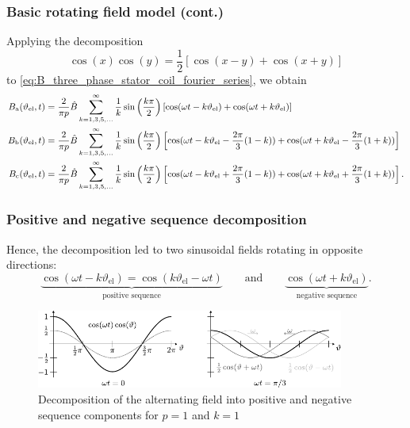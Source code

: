 \begin{frame}
	\frametitle{Basic rotating field model (cont.)}
    Applying the decomposition $$\cos(x)\cos(y) = \frac{1}{2} \left[ \cos(x-y) + \cos(x+y) \right]$$ to \eqref{eq:B_three_phase_stator_coil_fourier_series}, we obtain
    \begin{equation*}
        \small
        \begin{split}
            B_\mathrm{a}(\vartheta_\mathrm{el}, t) &= \frac{2}{\pi p} \hat{B} \sum_{k=1,3,5,\ldots}^{\infty}   \frac{1}{k}\sin\left(\frac{k \pi}{2}\right)\left[\cos(\omega t - k \vartheta_\mathrm{el}) + \cos(\omega t + k \vartheta_\mathrm{el})\right]\\
            B_\mathrm{b}(\vartheta_\mathrm{el}, t) &= \frac{2}{\pi p} \hat{B} \sum_{k=1,3,5,\ldots}^{\infty}   \frac{1}{k}\sin\left(\frac{k \pi}{2}\right)\left[\cos(\omega t - k \vartheta_\mathrm{el} - \frac{2\pi}{3}(1-k)) + \cos(\omega t + k \vartheta_\mathrm{el} - \frac{2\pi}{3}(1+k))\right]\\
            B_\mathrm{c}(\vartheta_\mathrm{el}, t) &= \frac{2}{\pi p} \hat{B} \sum_{k=1,3,5,\ldots}^{\infty}   \frac{1}{k}\sin\left(\frac{k \pi}{2}\right)\left[\cos(\omega t - k \vartheta_\mathrm{el} + \frac{2\pi}{3}(1-k)) + \cos(\omega t + k \vartheta_\mathrm{el} + \frac{2\pi}{3}(1+k))\right].
        \end{split}
    \end{equation*}

\end{frame}

\begin{frame}
	\frametitle{Positive and negative sequence decomposition}
    Hence, the decomposition led to two sinusoidal fields rotating in opposite directions:
    $$\underbrace{\cos(\omega t - k \vartheta_\mathrm{el})=\cos(k \vartheta_\mathrm{el} - \omega t)}_{\mbox{positive sequence}} \qquad  \mbox{and} \qquad \underbrace{\cos(\omega t + k \vartheta_\mathrm{el})}_{\mbox{negative sequence}}.$$
    \begin{figure}
        \centering
        \includegraphics[width=0.9\textwidth]{fig/lec05/Positive_negative_sequence_components.pdf}
        \caption{Decomposition of the alternating field into positive and negative sequence components for $p=1$ and $k=1$}
        \label{fig:Positive_negative_sequence_components}
    \end{figure}
\end{frame}

